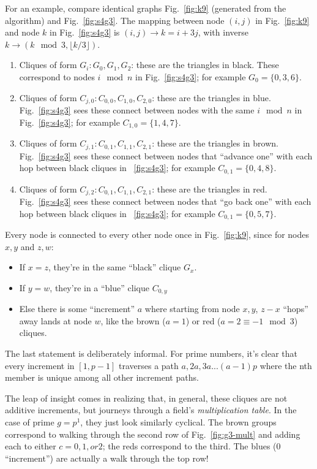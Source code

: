 \documentclass[11pt, oneside]{article} 	%
\begin{document}
For an example, compare identical graphs Fig.~\ref{fig:k9} (generated from the algorithm) and Fig.~\ref{fig:s4g3}. The mapping between node $(i,j)$ in Fig.~\ref{fig:k9} and node $k$ in Fig.~\ref{fig:s4g3} is $(i,j) \rightarrow k=i+3j$, with inverse $k \rightarrow (k \mod 3, \lfloor k / 3 \rfloor)$.

\begin{enumerate}
\item Cliques of form $G_i: G_0, G_1, G_2$: these are the triangles in black. These correspond to nodes $i \mod n$ in Fig.~\ref{fig:s4g3}; for example $G_0 = \{0, 3, 6\}$.
\item Cliques of form $C_{j, 0}: C_{0,0}, C_{1, 0}, C_{2,0}$: these are the triangles in blue. Fig.~\ref{fig:s4g3} sees these connect between nodes with the same $i \mod n$ in Fig.~\ref{fig:s4g3}; for example $C_{1,0} = \{1, 4, 7\}$.
\item Cliques of form $C_{j, 1}: C_{0,1}, C_{1, 1}, C_{2,1}$: these are the triangles in brown. Fig.~\ref{fig:s4g3} sees these connect between nodes that ``advance one'' with each hop between black cliques in ~\ref{fig:s4g3}; for example $C_{0,1} = \{0, 4, 8\}$.
\item Cliques of form $C_{j, 2}: C_{0,1}, C_{1, 1}, C_{2,1}$: these are the triangles in red. Fig.~\ref{fig:s4g3} sees these connect between nodes that ``go back one'' with each hop between black cliques in ~\ref{fig:s4g3}; for example $C_{0,1} = \{0, 5, 7\}$.
\end{enumerate}


Every node is connected to every other node once in Fig.~\ref{fig:k9}, since for nodes $x,y$ and $z,w$:
\begin{itemize}
\item If $x = z$, they're in the same ``black'' clique $G_x$.
\item If $y=w$, they're in a ``blue'' clique $C_{0,y}$
\item Else there is some ``increment'' $a$ where starting from node $x,y$, $z-x$ ``hops'' away lands at node $w$, like the brown ($a=1$) or red ($a=2\equiv -1 \mod 3 $) cliques.
\end{itemize}


The last statement is deliberately informal. For prime numbers, it's clear that every increment in $[1, p-1]$ traverses a path $a, 2a, 3a ... (a-1)p$ where the nth member is unique among all other increment paths.

The leap of insight comes in realizing that, in general, these cliques are not additive increments, but journeys through a field's \emph{multiplication table}. In the case of prime $g=p^1$, they just look similarly cyclical. The brown groups correspond to walking through the second row of Fig.~\ref{fig:g3-mult} and adding each to either $c=0, 1, or 2$; the reds correspond to the third. The blues (0 ``increment'') are actually a walk through the top row!
\end{document}
